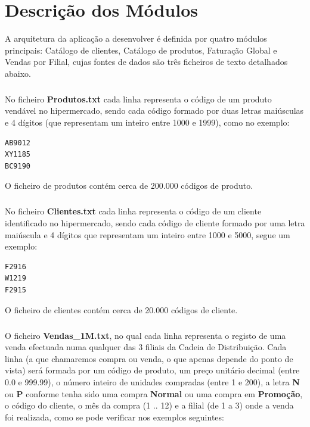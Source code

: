 \chapter{Descrição dos Módulos}

A arquitetura da aplicação a desenvolver é definida por quatro módulos principais: Catálogo de clientes, Catálogo de produtos, Faturação Global e Vendas por Filial, cujas fontes de dados são três ficheiros de texto detalhados abaixo.
 
\paragraph{}
No ficheiro \textbf{Produtos.txt} cada linha representa o código de um produto vendável no hipermercado, sendo cada código formado por duas letras maiúsculas e 4 dígitos (que representam um inteiro entre 1000 e 1999), como no exemplo: 

\begin{verbatim}
AB9012
XY1185
BC9190
\end{verbatim}

O ficheiro de produtos contém cerca de 200.000 códigos de produto. 

\paragraph{}
No ficheiro \textbf{Clientes.txt} cada linha representa o código de um cliente identificado no hipermercado, sendo cada código de cliente formado por uma letra maiúscula e 4 dígitos que representam um inteiro entre 1000 e 5000, segue um exemplo: 

\begin{Verbatim}
F2916
W1219
F2915
\end{Verbatim}

O ficheiro de clientes contém cerca de 20.000 códigos de cliente. 

\paragraph{}
O ficheiro \textbf{Vendas\_1M.txt}, no qual cada linha representa o registo de uma venda efectuada numa qualquer das 3 filiais da Cadeia de Distribuição. Cada linha (a que chamaremos compra ou venda, o que apenas depende do ponto de vista) será formada por um código de produto, um preço unitário decimal (entre 0.0 e 999.99), o número inteiro de unidades compradas (entre 1 e 200), a letra \textbf{N} ou \textbf{P} conforme tenha sido uma compra \textbf{Normal} ou uma compra em \textbf{Promoção}, o código do cliente, o mês da compra (1 .. 12) e a filial (de 1 a 3) onde a venda foi realizada, como se pode verificar nos exemplos seguintes:
 
